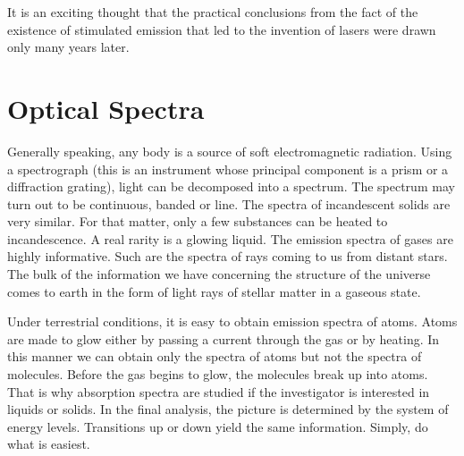 It is an exciting thought that the practical conclusions from the fact of the existence of stimulated emission that led to the invention of lasers were drawn only many years later.

\section{Optical Spectra}

Generally speaking, any body is a source of soft electromagnetic radiation. Using a spectrograph (this is an instrument whose principal component is a prism or a diffraction grating), light can be decomposed into a spectrum. The spectrum may turn out to be continuous, banded or line. The spectra of incandescent solids are very similar. For that matter, only a few substances can be heated to incandescence. A real rarity is a glowing liquid. The emission spectra of gases are highly informative. Such are the spectra of rays coming to us from distant stars. The bulk of the information we have concerning the structure of the universe comes to earth in the form of light rays of stellar matter in a gaseous state.

Under terrestrial conditions, it is easy to obtain emission spectra of atoms. Atoms are made to glow either by passing a current through the gas or by heating. In this manner we can obtain only the spectra of atoms but not the spectra of molecules. Before the gas begins to glow, the molecules break up into atoms. That is why absorption spectra are studied if the investigator is interested in liquids or solids. In the final analysis, the picture is determined by the system of energy levels. Transitions up or down yield the same information. Simply, do what is easiest.

